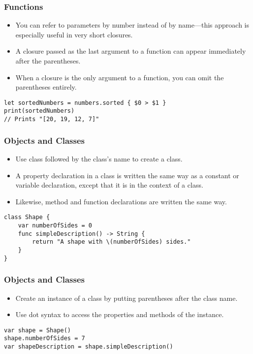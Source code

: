 \begin{frame}[fragile] \frametitle{Functions}
\begin{itemize}
\item You can refer to parameters by number instead of by name—this approach is especially useful in very short closures. 
\item A closure passed as the last argument to a function can appear immediately after the parentheses. 
\item When a closure is the only argument to a function, you can omit the parentheses entirely.
\end{itemize}

\begin{lstlisting}
let sortedNumbers = numbers.sorted { $0 > $1 }
print(sortedNumbers)
// Prints "[20, 19, 12, 7]"
\end{lstlisting}

\end{frame}

\begin{frame}[fragile] \frametitle{Objects and Classes}
\begin{itemize}
\item Use class followed by the class’s name to create a class. 
\item A property declaration in a class is written the same way as a constant or variable declaration, except that it is in the context of a class. 
\item Likewise, method and function declarations are written the same way.
\end{itemize}

\begin{lstlisting}
class Shape {
    var numberOfSides = 0
    func simpleDescription() -> String {
        return "A shape with \(numberOfSides) sides."
    }
}
\end{lstlisting}

\end{frame}

\begin{frame}[fragile] \frametitle{Objects and Classes}
\begin{itemize}
\item Create an instance of a class by putting parentheses after the class name. 
\item Use dot syntax to access the properties and methods of the instance.
\end{itemize}

\begin{lstlisting}
var shape = Shape()
shape.numberOfSides = 7
var shapeDescription = shape.simpleDescription()
\end{lstlisting}


\end{frame}


